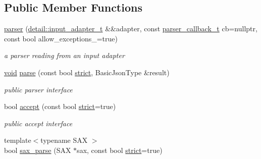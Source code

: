 \subsection*{Public Member Functions}
\begin{DoxyCompactItemize}
\item 
\hyperlink{classnlohmann_1_1detail_1_1parser_a1a2bd258b7e99f86b7e6a3c41373ba55}{parser} (\hyperlink{namespacenlohmann_1_1detail_ae132f8cd5bb24c5e9b40ad0eafedf1c2}{detail\+::input\+\_\+adapter\+\_\+t} \&\&adapter, const \hyperlink{classnlohmann_1_1detail_1_1parser_ad250ad4f2b4af4a497e727c963162ff1}{parser\+\_\+callback\+\_\+t} cb=nullptr, const bool allow\+\_\+exceptions\+\_\+=true)
\begin{DoxyCompactList}\small\item\em a parser reading from an input adapter \end{DoxyCompactList}\item 
\hyperlink{namespacenlohmann_1_1detail_a59fca69799f6b9e366710cb9043aa77d}{void} \hyperlink{classnlohmann_1_1detail_1_1parser_a14338d8f3174601c0b2b7ef28752ab17}{parse} (const bool \hyperlink{namespacenlohmann_1_1detail_a5a76b60b26dc8c47256a996d18d967dfa2133fd717402a7966ee88d06f9e0b792}{strict}, Basic\+Json\+Type \&result)
\begin{DoxyCompactList}\small\item\em public parser interface \end{DoxyCompactList}\item 
bool \hyperlink{classnlohmann_1_1detail_1_1parser_a20997b42262856935b60fc91bf05bf3f}{accept} (const bool \hyperlink{namespacenlohmann_1_1detail_a5a76b60b26dc8c47256a996d18d967dfa2133fd717402a7966ee88d06f9e0b792}{strict}=true)
\begin{DoxyCompactList}\small\item\em public accept interface \end{DoxyCompactList}\item 
{\footnotesize template$<$typename S\+AX $>$ }\\bool \hyperlink{classnlohmann_1_1detail_1_1parser_a14e34931965064b26e118eb72cbd5e25}{sax\+\_\+parse} (S\+AX $\ast$sax, const bool \hyperlink{namespacenlohmann_1_1detail_a5a76b60b26dc8c47256a996d18d967dfa2133fd717402a7966ee88d06f9e0b792}{strict}=true)
\end{DoxyCompactItemize}
